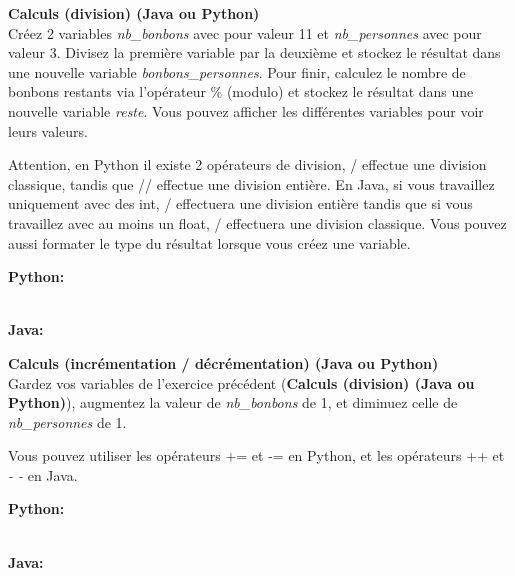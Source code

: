  \begin{Exercice}[10 minutes] \textbf{Calculs (division) (Java ou Python)}\\
     Créez 2 variables \textit{nb\_bonbons} avec pour valeur 11 et \textit{nb\_personnes} avec pour valeur 3. Divisez la première variable par la deuxième et stockez le résultat dans une nouvelle variable \textit{bonbons\_personnes}. Pour finir, calculez le nombre de bonbons restants via l'opérateur \% (modulo) et stockez le résultat dans une nouvelle variable \textit{reste}. Vous pouvez afficher les différentes variables pour voir leurs valeurs. \\
     
      \begin{conseil}
            Attention, en Python il existe 2 opérateurs de division, / effectue une division classique, tandis que // effectue une division entière. En Java, si vous travaillez uniquement avec des int, / effectuera une division entière tandis que si vous travaillez avec au moins un float, / effectuera une division classique. Vous pouvez aussi formater le type du résultat lorsque vous créez une variable.
          
      \end{conseil}
      \begin{solution}
      
      \textbf{Python:}
      
      
      
      \textbf{\\Java:}
      
             
      \end{solution}   
  \end{Exercice}
  
 \begin{Exercice}[5 minutes] \textbf{Calculs (incrémentation / décrémentation) (Java ou Python)}\\
    Gardez vos variables de l'exercice précédent (\textbf{Calculs (division) (Java ou Python)}), augmentez la valeur de \textit{nb\_bonbons} de 1, et diminuez celle de \textit{nb\_personnes} de 1.  \\
    
     \begin{conseil}
           Vous pouvez utiliser les opérateurs += et -= en Python, et les opérateurs ++ et \textit{- -} en Java.
         
     \end{conseil}
     \begin{solution}
     
     \textbf{Python:}
     
     
     \textbf{\\Java:}
     
            
     \end{solution}   
 \end{Exercice}

